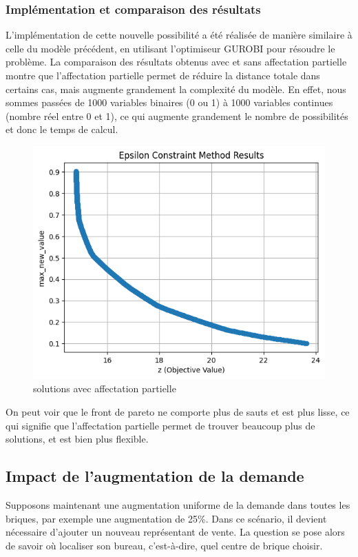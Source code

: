 \subsubsection{Implémentation et comparaison des résultats}
L'implémentation de cette nouvelle possibilité a été réalisée de manière similaire à celle du modèle précédent, en utilisant l'optimiseur GUROBI pour résoudre le problème. La comparaison des résultats obtenus avec et sans affectation partielle montre que l'affectation partielle permet de réduire la distance totale dans certains cas, mais augmente grandement la complexité du modèle.
En effet, nous sommes passées de 1000 variables binaires (0 ou 1) à 1000 variables continues (nombre réel entre 0 et 1), ce qui augmente grandement le nombre de possibilités et donc le temps de calcul.


\begin{figure}[H]
    \centering
    \includegraphics[width=\textwidth]{Images/step_2/step_2-pareto_front.png}
    \caption{solutions avec affectation partielle}
    \label{fig:new_SR_location}
\end{figure}

On peut voir que le front de pareto ne comporte plus de sauts et est plus lisse, ce qui signifie que l'affectation partielle permet de trouver beaucoup plus de solutions, et est bien plus flexible.

\subsection{Impact de l'augmentation de la demande}
Supposons maintenant une augmentation uniforme de la demande dans toutes les briques, par exemple une augmentation de 25\%. Dans ce scénario, il devient nécessaire d'ajouter un nouveau représentant de vente. La question se pose alors de savoir où localiser son bureau, c'est-à-dire, quel centre de brique choisir.

